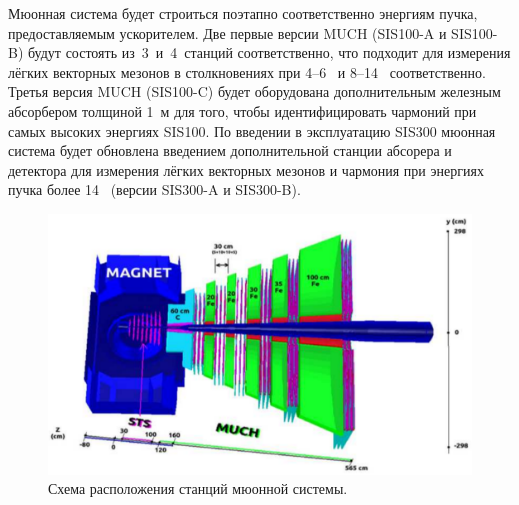 Мюонная система будет строиться поэтапно соответственно энергиям пучка, предоставляемым ускорителем.
Две первые версии MUCH (SIS100-A и SIS100-B) будут состоять из~3~и~4~станций соответственно, что подходит для измерения лёгких векторных мезонов в столкновениях при 4--6~\GeVperNucl{} и 8--14~\GeVperNucl{} соответственно. Третья версия MUCH (SIS100-C) будет оборудована дополнительным железным абсорбером толщиной 1~м для того, чтобы идентифицировать чармоний при самых высоких энергиях SIS100.
По введении в эксплуатацию SIS300 мюонная система будет обновлена введением дополнительной станции абсорера и детектора для измерения лёгких векторных мезонов и чармония при энергиях пучка более 14~\GeVperNucl{} (версии SIS300-A и SIS300-B).



\begin{figure}[H]
\includegraphics[width=1.0\textwidth]{pictures/MUCH.png}
\caption{Схема расположения станций мюонной системы.}
\label{fig:MUCH}
\end{figure}

